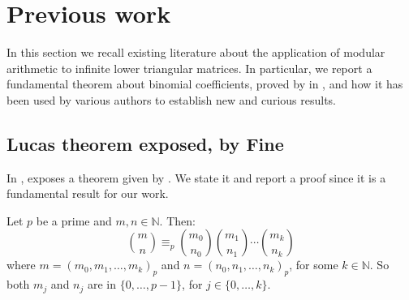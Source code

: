 
\section{Previous work}

In this section we recall existing literature about the application of modular
arithmetic to infinite lower triangular matrices. In particular, we report a
fundamental theorem about binomial coefficients, proved by
\citeauthor{lucas:theorie:des:nombres} in \cite{lucas:theorie:des:nombres}, and
how it has been used by various authors to establish new and curious results.

\subsection{Lucas theorem exposed, by Fine}

In \cite{fine:1947}, \citeauthor{fine:1947} exposes a theorem given by
\citeauthor{lucas:theorie:des:nombres}. We state it and report a proof since
it is a fundamental result for our work. 
\begin{theorem}
    Let $p$ be a prime and $m,n\in\mathbb{N}$. Then:
    \begin{displaymath}
        {{m}\choose{n}} \equiv_{p} 
            {{m_{0}}\choose{n_{0}}} 
            {{m_{1}}\choose{n_{1}}} 
            \cdots 
            {{m_{k}}\choose{n_{k}}} 
    \end{displaymath}
    where $m=\left(m_{0},m_{1},\ldots,m_{k}\right)_{p}$ and
    $n=\left(n_{0},n_{1},\ldots,n_{k}\right)_{p}$, for some $k\in\mathbb{N}$.
    So both $m_{j}$ and $n_{j}$ are in $\lbrace 0,\ldots, p-1 \rbrace$, for
    $j\in\lbrace 0,\ldots,k\rbrace$.
    \label{thm:lucas:theorem}
\end{theorem}

